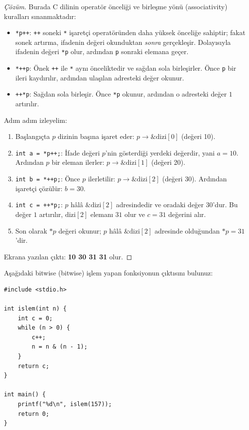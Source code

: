 \begin{proof}[Çözüm]
Burada C dilinin operatör önceliği ve birleşme yönü (associativity) kuralları sınanmaktadır:
\begin{itemize}
    \item \texttt{*p++}: \texttt{++} soneki \texttt{*} işaretçi operatöründen daha yüksek önceliğe sahiptir; fakat sonek artırma, ifadenin değeri okunduktan \emph{sonra} gerçekleşir. Dolayısıyla ifadenin değeri \texttt{*p} olur, ardından \texttt{p} sonraki elemana geçer.
    \item \texttt{*++p}: Önek \texttt{++} ile \texttt{*} aynı önceliktedir ve sağdan sola birleşirler. Önce \texttt{p} bir ileri kaydırılır, ardından ulaşılan adresteki değer okunur.
    \item \texttt{++*p}: Sağdan sola birleşir. Önce \texttt{*p} okunur, ardından o adresteki değer $1$ artırılır.
\end{itemize}

Adım adım izleyelim:
\begin{enumerate}
    \item Başlangıçta $p$ dizinin başına işaret eder: $p \to \&\text{dizi}[0]$ (değeri 10).
    \item \texttt{int a = *p++;}: İfade değeri $p$'nin gösterdiği yerdeki değerdir, yani $a = 10$. Ardından $p$ bir eleman ilerler: $p \to \&\text{dizi}[1]$ (değeri 20).
    \item \texttt{int b = *++p;}: Önce $p$ ilerletilir: $p \to \&\text{dizi}[2]$ (değeri 30). Ardından işaretçi çözülür: $b = 30$.
    \item \texttt{int c = ++*p;}: $p$ hâlâ $\&\text{dizi}[2]$ adresindedir ve oradaki değer $30$'dur. Bu değer $1$ artırılır, $\text{dizi}[2]$ elemanı $31$ olur ve $c = 31$ değerini alır.
    \item Son olarak $*p$ değeri okunur; $p$ hâlâ $\&\text{dizi}[2]$ adresinde olduğundan $*p = 31$'dir.
\end{enumerate}

Ekrana yazılan çıktı: \textbf{10 30 31 31} olur.
\end{proof}

\begin{example}
Aşağıdaki bitwise (bitwise) işlem yapan fonksiyonun çıktısını bulunuz:

\begin{lstlisting}[language=CTemel]
#include <stdio.h>

int islem(int n) {
    int c = 0;
    while (n > 0) {
        c++;
        n = n & (n - 1);
    }
    return c;
}

int main() {
    printf("%d\n", islem(157));
    return 0;
}
\end{lstlisting}
\end{example}

